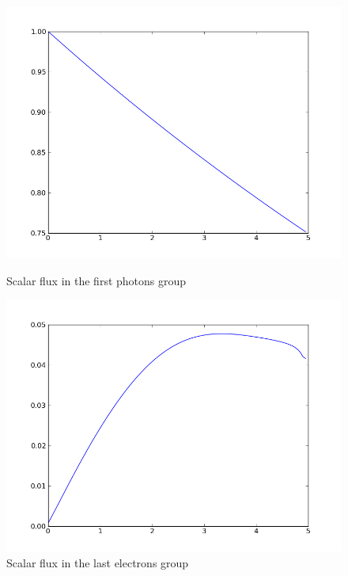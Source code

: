 \begin{figure}[H]
\begin{minipage}[b]{0.45\linewidth}
\centering
\includegraphics[width=\linewidth]{./images/al/group_0_moment_0}
\caption{Scalar flux in the first photons group}
\end{minipage}
\hspace{0.5cm}
\begin{minipage}[b]{0.45\linewidth}
\centering
\includegraphics[width=\linewidth]{./images/al/group_39_moment_0}
\caption{Scalar flux in the last electrons group}
\end{minipage}
\end{figure}

